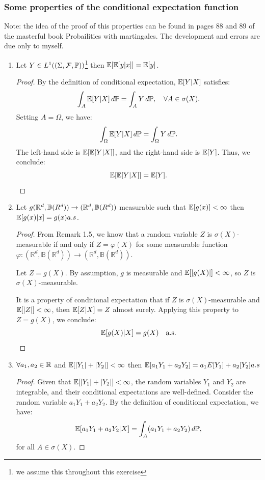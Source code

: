 \documentclass{article}
\begin{document}
\subsubsection{Some properties of the conditional expectation function}
Note: the idea of the proof of this properties can be found in pages 88 and 89 of the masterful book Probailities with martingales. The development and errors are due only to myself. 
\begin{enumerate}
    \item Let \(Y\in L^{1}((\Sigma, \mathcal{F}, \mathbb{P}))\)\footnote{we assume this throughout this exercise} then \(\mathbb{E}[\mathbb{E}[y|x]]=\mathbb{E}[y]\). 
    
    \begin{proof}
    By the definition of conditional expectation, \(\mathbb{E}[Y|X]\) satisfies:
    \[
    \int_A \mathbb{E}[Y|X] \, d\mathbb{P} = \int_A Y \, d\mathbb{P}, \quad \forall A \in \sigma(X).
    \]
    Setting \(A = \Omega\), we have:
    \[
    \int_\Omega \mathbb{E}[Y|X] \, d\mathbb{P} = \int_\Omega Y \, d\mathbb{P}.
    \]
    The left-hand side is \(\mathbb{E}[\mathbb{E}[Y|X]]\), and the right-hand side is \(\mathbb{E}[Y]\). Thus, we conclude:
    \[
    \mathbb{E}[\mathbb{E}[Y|X]] = \mathbb{E}[Y].
    \]
    \end{proof}
    \item Let \(g(\mathbb{R}^{d}, \mathbb{B}(R^{d}))\rightarrow (\mathbb{R}^{d}, \mathbb{B}(R^{d}))\) measurable such that \(\mathbb{E}[g(x)]<\infty\) then \(\mathbb{E}[g(x)|x]=g(x) a.s\). 
    
    \begin{proof}
        From Remark 1.5, we know that a random variable \(Z\) is \(\sigma(X)\)-measurable if and only if \(Z = \varphi(X)\) for some measurable function \(\varphi : (\mathbb{R}^d, \mathbb{B}(\mathbb{R}^d)) \to (\mathbb{R}^d, \mathbb{B}(\mathbb{R}^d))\). 
        
        Let \(Z = g(X)\). By assumption, \(g\) is measurable and \(\mathbb{E}[|g(X)|] < \infty\), so \(Z\) is \(\sigma(X)\)-measurable. 
        
        It is a property of conditional expectation that if \(Z\) is \(\sigma(X)\)-measurable and \(\mathbb{E}[|Z|] < \infty\), then \(\mathbb{E}[Z|X] = Z\) almost surely. Applying this property to \(Z = g(X)\), we conclude:
        \[
        \mathbb{E}[g(X) | X] = g(X) \quad \text{a.s.}
        \]
        \end{proof}




    \item \(\forall a_{1}, a_{2} \in \mathbb{R}\) and \(\mathbb{E}[|Y_{1}|+|Y_{2}|]<\infty\) then \(\mathbb{E}[a_{1}Y_{1}+a_{2}Y_{2}]=a_{1}E[Y_{1}]+a_{2}[Y_{2}] a.s\)
    \begin{proof}
        Given that \(\mathbb{E}[|Y_{1}| + |Y_{2}|] < \infty\), the random variables \(Y_1\) and \(Y_2\) are integrable, and their conditional expectations are well-defined. Consider the random variable \(a_1 Y_1 + a_2 Y_2\). By the definition of conditional expectation, we have:
        \[
        \mathbb{E}[a_1 Y_1 + a_2 Y_2 | X] = \int_A (a_1 Y_1 + a_2 Y_2) \, d\mathbb{P},
        \]
        for all \(A \in \sigma(X)\).
        

\end{proof}
\end{enumerate}
\end{document}

